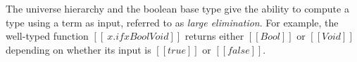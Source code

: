 \documentclass[\ifpublic nolinenum\else\fi,online,OA]{jfp}
\newcommand{\scw}[1]{}
\theoremstyle{definition}
\begin{document}

The universe hierarchy and the boolean base type give the
ability to compute a type using a term as input, referred to as
\emph{large elimination}. For example, the well-typed function
$[[\ x . if x Bool Void]]$ returns either $[[Bool]]$ or $[[Void]]$
depending on whether its input is $[[true]]$ or $[[false]]$.




\end{document}
